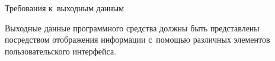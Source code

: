 \subsubsection{} Требования к~выходным данным
\label{sec:analysis:research:req:outputs}

Выходные данные программного средства должны быть представлены посредством отображения информации с~помощью различных элементов пользовательского интерфейса.